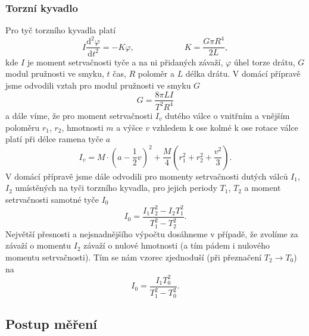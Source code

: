 \documentclass[english]{article}
\begin{document}
			\subsubsection{Torzní kyvadlo}
					Pro tyč torzního kyvadla platí
					\begin{equation}
					I \frac{\mathrm{d}^2 \varphi}{\mathrm{d} t^2} = - K \varphi, \qquad \qquad \qquad K = \frac{G \pi R^4}{2L},
					\end{equation}
					kde $I$ je moment setrvačnosti tyče a na ni přidaných závaží, $\varphi$ úhel torze drátu, $G$ modul pružnosti ve smyku, $t$ čas, $R$ poloměr a $L$ délka drátu. V domácí přípravě jsme odvodili vztah pro modul pružnosti ve smyku $G$ 
					\begin{equation}\label{eq:G_kmity}
							G=\frac{8\pi L I}{T^2R^4}
					\end{equation}			
					a dále víme, že pro moment setrvačnosti $I_v$ dutého válce o vnitřním a vnějším poloměru $r_1$, $r_2$, hmotnosti $m$ a výšce $v$ vzhledem k ose kolmé k ose rotace válce platí při délce ramena tyče $a$
					\begin{equation}\label{eq:teo_steiner}
					I_v = M\cdot (a-\frac{1}{2}v)^2 + \frac{M}{4}(r_1^2 + r_2^2 + \frac{v^2}{3}).
					\end{equation}					
					V domácí přípravě jsme dále odvodili pro momenty setrvačnosti dutých válců $I_1$, $I_2$ umístěných na tyči torzního kyvadla, pro jejich periody $T_1$, $T_2$ a moment setrvačnosti samotné tyče $I_0$
					\begin{equation}
							I_0 = \frac{I_1T_2^2-I_2T_1^2}{T_1^2-T_2^2}.
					\end{equation} 
					Největší přesnosti a nejsnadnějšího výpočtu dosáhneme v případě, že zvolíme za závaží o momentu $I_2$ závaží o nulové hmotnosti (a tím pádem i nulového momentu setrvačnosti). Tím se nám vzorec zjednoduší (při přeznačení $T_2 \rightarrow T_0$) na 
					\begin{equation}\label{eq:I_0}
							I_0 = \frac{I_1T_0^2}{T_1^2-T_0^2}.
					\end{equation} 
					
	\subsection{Postup měření}
\end{document}
